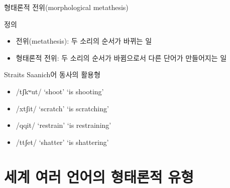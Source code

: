 \documentclass[11pt, aspectratio=169]{beamer}
\newcommand{\textds}[1]{{\ipafont #1}}
\begin{document}
\begin{frame}[t]{형태론적 전위(morphological metathesis)}
  \begin{block}{정의}
    \begin{itemize}
      \item 전위(metathesis): 두 소리의 순서가 바뀌는 일
      \item 형태론적 전위: 두 소리의 순서가 바뀜으로서 다른 단어가 만들어지는 일
    \end{itemize}
  \end{block}
  \begin{block}{Straits Saanich어 동사의 활용형}
    \begin{itemize}
      \item \textds{/tʃkʷut/} ‘shoot’  \textds{[tʃukʷt]} ‘is shooting’
      \item \textds{/xtʃit/} ‘scratch’ \textds{[xitʃt]} ‘is scratching’
      \item \textds{/qqit/} ‘restrain’  \textds{[qiqt]} ‘is restraining’
      \item \textds{/ttʃet/} ‘shatter’  \textds{[tetʃt]} ‘is shattering’
    \end{itemize}
    
  \end{block}
  
\end{frame}

\section{세계 여러 언어의 형태론적 유형}
\end{document}

